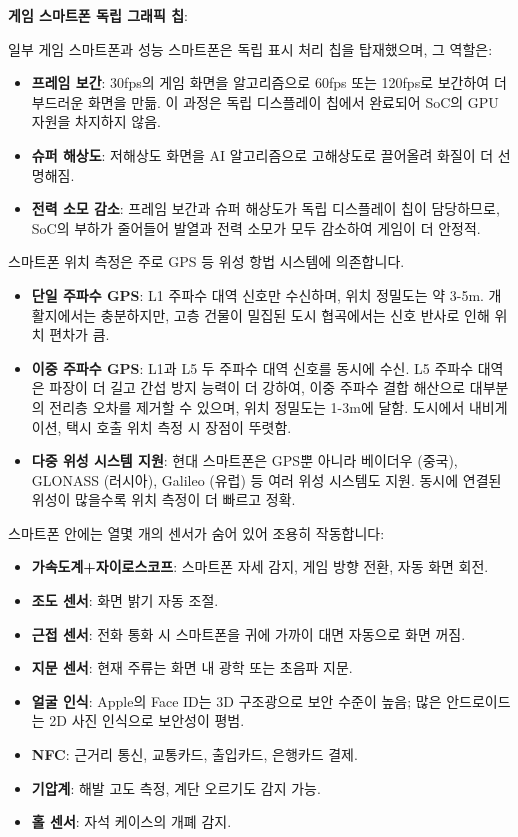 \textbf{게임 스마트폰 독립 그래픽 칩}:

일부 게임 스마트폰과 성능 스마트폰은 독립 표시 처리 칩을 탑재했으며, 그 역할은:

\begin{itemize}
  \item \textbf{프레임 보간}: 30fps의 게임 화면을 알고리즘으로 60fps 또는 120fps로 보간하여 더 부드러운 화면을 만듦. 이 과정은 독립 디스플레이 칩에서 완료되어 SoC의 GPU 자원을 차지하지 않음.
  \item \textbf{슈퍼 해상도}: 저해상도 화면을 AI 알고리즘으로 고해상도로 끌어올려 화질이 더 선명해짐.
  \item \textbf{전력 소모 감소}: 프레임 보간과 슈퍼 해상도가 독립 디스플레이 칩이 담당하므로, SoC의 부하가 줄어들어 발열과 전력 소모가 모두 감소하여 게임이 더 안정적.
\end{itemize}


스마트폰 위치 측정은 주로 GPS 등 위성 항법 시스템에 의존합니다.

\begin{itemize}
  \item \textbf{단일 주파수 GPS}: L1 주파수 대역 신호만 수신하며, 위치 정밀도는 약 3-5m. 개활지에서는 충분하지만, 고층 건물이 밀집된 도시 협곡에서는 신호 반사로 인해 위치 편차가 큼.
  \item \textbf{이중 주파수 GPS}: L1과 L5 두 주파수 대역 신호를 동시에 수신. L5 주파수 대역은 파장이 더 길고 간섭 방지 능력이 더 강하여, 이중 주파수 결합 해산으로 대부분의 전리층 오차를 제거할 수 있으며, 위치 정밀도는 1-3m에 달함. 도시에서 내비게이션, 택시 호출 위치 측정 시 장점이 뚜렷함.
  \item \textbf{다중 위성 시스템 지원}: 현대 스마트폰은 GPS뿐 아니라 베이더우 (중국), GLONASS (러시아), Galileo (유럽) 등 여러 위성 시스템도 지원. 동시에 연결된 위성이 많을수록 위치 측정이 더 빠르고 정확.
\end{itemize}


스마트폰 안에는 열몇 개의 센서가 숨어 있어 조용히 작동합니다:

\begin{itemize}
  \item \textbf{가속도계+자이로스코프}: 스마트폰 자세 감지, 게임 방향 전환, 자동 화면 회전.
  \item \textbf{조도 센서}: 화면 밝기 자동 조절.
  \item \textbf{근접 센서}: 전화 통화 시 스마트폰을 귀에 가까이 대면 자동으로 화면 꺼짐.
  \item \textbf{지문 센서}: 현재 주류는 화면 내 광학 또는 초음파 지문.
  \item \textbf{얼굴 인식}: Apple의 Face ID는 3D 구조광으로 보안 수준이 높음; 많은 안드로이드는 2D 사진 인식으로 보안성이 평범.
  \item \textbf{NFC}: 근거리 통신, 교통카드, 출입카드, 은행카드 결제.
  \item \textbf{기압계}: 해발 고도 측정, 계단 오르기도 감지 가능.
  \item \textbf{홀 센서}: 자석 케이스의 개폐 감지.
\end{itemize}

